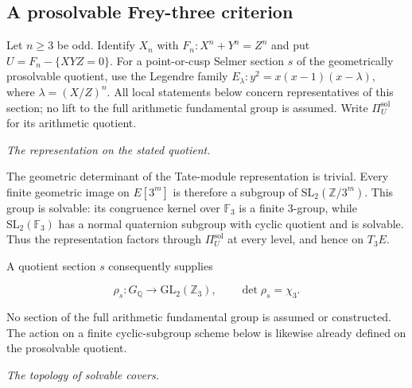 \subsection{A prosolvable Frey-three criterion}
\label{subsec:frey-three}
Let $n\ge3$ be odd. Identify $X_n$ with
$F_n:X^n+Y^n=Z^n$ and put $U=F_n-\{XYZ=0\}$.
For a point-or-cusp Selmer section $s$ of the geometrically
prosolvable quotient, use the Legendre family
$E_\lambda:y^2=x(x-1)(x-\lambda)$, where $\lambda=(X/Z)^n$.
All local statements below concern representatives of this section;
no lift to the full arithmetic fundamental group is assumed.
Write $\Pi_U^{\mathrm{sol}}$ for its arithmetic quotient.
\par\medskip\noindent\textit{The representation on the stated quotient.}\quad 

The geometric determinant of the Tate-module representation is trivial.
Every finite geometric image on \(E[3^m]\) is therefore a subgroup of
\(\mathrm{SL}_2(\mathbb Z/3^m)\). This group is solvable: its congruence
kernel over \(\mathbb F_3\) is a finite 3-group, while
\(\mathrm{SL}_2(\mathbb F_3)\) has a normal quaternion subgroup with
cyclic quotient and is solvable. Thus the representation factors through
\(\Pi_U^{\mathrm{sol}}\) at every level, and hence on \(T_3E\).

A quotient section \(s\) consequently supplies

\[
\rho_s:G_{\mathbb Q}\longrightarrow
\mathrm{GL}_2(\mathbb Z_3),\qquad \det\rho_s=\chi_3.
\]

No section of the full arithmetic fundamental group is assumed or
constructed. The action on a finite cyclic-subgroup scheme below is
likewise already defined on the prosolvable quotient.

\par\medskip\noindent\textit{The topology of solvable covers.}\quad 

